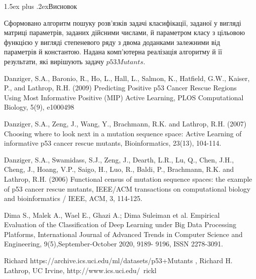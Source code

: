 \documentclass[12pt,a4paper]{article}
\makeatletter
\renewcommand{\section}{\@startsection{section}{1}{18pt}{3.25ex plus 1ex minus 0.2ex}%
{1.5ex plus .2ex}{\bfseries\rmfamily\Large}}
\theoremstyle{myplain}
\numberwithin{equation}{section}
\makeatother
\begin{document}
\section{Висновок}

Сформовано алгоритм пошуку розв'язків задачі класифікації, заданої у вигляді матриці параметрів, заданих дійсними числами, й параметром класу з цільовою функцією у вигляді степеневого ряду з двома доданками залежними від параметрів й константою. Надана комп'ютерна реалізація алгоритму й її результати, які вирішують задачу $p53Mutants$.

\newpage
{}
{}
\begin{thebibliography}{X}

Danziger, S.A., Baronio, R., Ho, L., Hall, L., Salmon, K., Hatfield, G.W., Kaiser, P., and Lathrop, R.H. (2009) Predicting Positive p53 Cancer Rescue Regions Using Most Informative Positive (MIP) Active Learning, PLOS Computational Biology, 5(9), e1000498

Danziger, S.A., Zeng, J., Wang, Y., Brachmann, R.K. and Lathrop, R.H. (2007) Choosing where to look next in a mutation sequence space: Active Learning of informative p53 cancer rescue mutants, Bioinformatics, 23(13), 104-114.

Danziger, S.A., Swamidass, S.J., Zeng, J., Dearth, L.R., Lu, Q., Chen, J.H., Cheng, J., Hoang, V.P., Saigo, H., Luo, R., Baldi, P., Brachmann, R.K. and Lathrop, R.H. (2006) Functional census of mutation sequence spaces: the example of p53 cancer rescue mutants, IEEE/ACM transactions on computational biology and bioinformatics / IEEE, ACM, 3, 114-125.

Dima S., Malek A., Wael E., Ghazi A.; Dima Suleiman et al. Empirical Evaluation of the Classification of Deep Learning
under Big Data Processing Platforms, International Journal of Advanced Trends in Computer Science and Engineering, 9(5),September-October 2020, 9189- 9196, ISSN 2278-3091.

Richard https://archive.ics.uci.edu/ml/datasets/p53+Mutants , Richard H. Lathrop, UC Irvine, http://www.ics.uci.edu/~rickl

\end{thebibliography}
\end{document}
